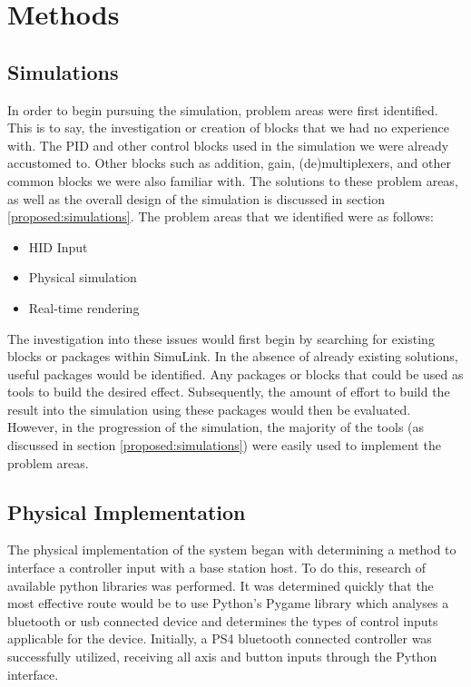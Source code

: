 
\section{Methods}


\subsection{Simulations}

In order to begin pursuing the simulation, problem areas were first identified.  This is to say, the investigation or creation of blocks that we had no experience with.  The PID and other control blocks used in the simulation we were already accustomed to.  Other blocks such as addition, gain, (de)multiplexers, and other common blocks we were also familiar with.  The solutions to these problem areas, as well as the overall design of the simulation is discussed in section \ref{proposed:simulations}.  The problem areas that we identified were as follows:

\begin{itemize}
	\item HID Input
	\item Physical simulation
	\item Real-time rendering
\end{itemize}

The investigation into these issues would first begin by searching for existing blocks or packages within SimuLink.  In the absence of already existing solutions, useful packages would be identified.  Any packages or blocks that could be used as tools to build the desired effect.  Subsequently, the amount of effort to build the result into the simulation using these packages would then be evaluated.  However, in the progression of the simulation, the majority of the tools (as discussed in section \ref{proposed:simulations}) were easily used to implement the problem areas.

\subsection{Physical Implementation}

The physical implementation of the system began with determining a method to interface a controller input with a base station host. To do this, research of available python libraries was performed. It was determined quickly that the most effective route would be to use Python's Pygame library which analyses a bluetooth or usb connected device and determines the types of control inputs applicable for the device. Initially, a PS4 bluetooth connected controller was successfully utilized, receiving all axis and button inputs through the Python interface. 


